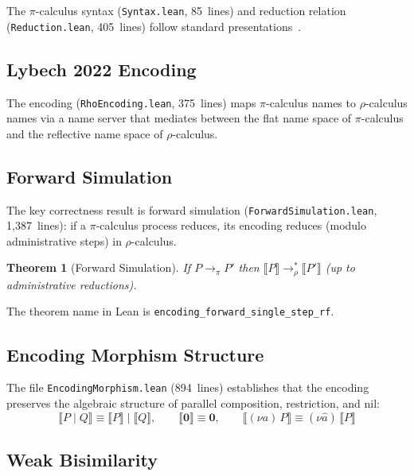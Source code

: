 \documentclass[11pt]{article}
\newtheorem{theorem}{Theorem}[section]
\theoremstyle{definition}
\theoremstyle{remark}
\begin{document}
The $\pi$-calculus syntax (\texttt{Syntax.lean}, 85~lines) and
reduction relation (\texttt{Reduction.lean}, 405~lines) follow
standard presentations~\cite{SangiorgiWalker2001}.

\subsection{Lybech 2022 Encoding}

The encoding (\texttt{RhoEncoding.lean}, 375~lines) maps $\pi$-calculus
names to $\rho$-calculus names via a name server that mediates
between the flat name space of $\pi$-calculus and the reflective name
space of $\rho$-calculus.

\subsection{Forward Simulation}

The key correctness result is forward simulation
(\texttt{ForwardSimulation.lean}, 1{,}387~lines): if a $\pi$-calculus
process reduces, its encoding reduces (modulo administrative steps) in
$\rho$-calculus.

\begin{theorem}[Forward Simulation]
\label{thm:forward-sim}
If $P \to_\pi P'$ then $\llbracket P \rrbracket \to_\rho^* \llbracket P' \rrbracket$
(up to administrative reductions).
\end{theorem}

\noindent
The theorem name in Lean is \texttt{encoding\_forward\_single\_step\_rf}.

\subsection{Encoding Morphism Structure}

The file \texttt{EncodingMorphism.lean} (894~lines) establishes that
the encoding preserves the algebraic structure of parallel composition,
restriction, and nil:
\[
  \llbracket P \mathbin{|} Q \rrbracket \equiv \llbracket P \rrbracket \mathbin{|} \llbracket Q \rrbracket, \qquad
  \llbracket \mathbf{0} \rrbracket \equiv \mathbf{0}, \qquad
  \llbracket (\nu a)\, P \rrbracket \equiv (\nu \hat{a})\, \llbracket P \rrbracket
\]

\subsection{Weak Bisimilarity}
\end{document}
